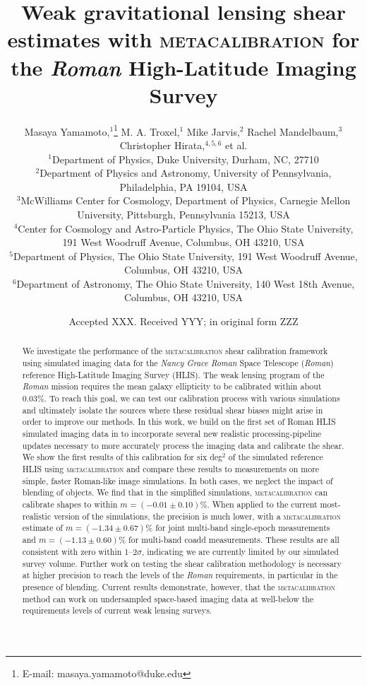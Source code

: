 \documentclass[fleqn,usenatbib]{mnras}
\title[Metacalibration for the Roman High-Latitude Imaging Survey]{Weak gravitational lensing shear estimates with \textsc{metacalibration} for the \emph{Roman} High-Latitude Imaging Survey}
\author[M. Yamamoto et al.]{
Masaya Yamamoto,$^{1}$\thanks{E-mail: masaya.yamamoto@duke.edu}
M. A. Troxel,$^{1}$
Mike Jarvis,$^{2}$
Rachel Mandelbaum,$^{3}$
Christopher Hirata,$^{4,5,6}$
 et al.\\
$^{1}$Department of Physics, Duke University, Durham, NC, 27710\\
$^{2}$Department of Physics and Astronomy, University of Pennsylvania, Philadelphia, PA 19104, USA\\
$^{3}$McWilliams Center for Cosmology, Department of Physics, Carnegie Mellon University, Pittsburgh, Pennsylvania 15213, USA\\
$^{4}$Center for Cosmology and Astro-Particle Physics, The Ohio State University, 191 West Woodruff Avenue, Columbus, OH 43210, USA\\
$^{5}$Department of Physics, The Ohio State University, 191 West Woodruff Avenue, Columbus, OH 43210, USA\\
$^{6}$Department of Astronomy, The Ohio State University, 140 West 18th Avenue, Columbus, OH 43210, USA\\
}
\date{Accepted XXX. Received YYY; in original form ZZZ}
\begin{document}
\label{firstpage}
\pagerange{\pageref{firstpage}--\pageref{lastpage}}
\maketitle

\begin{abstract}
We investigate the performance of the \textsc{metacalibration} shear calibration framework using simulated imaging data for the \emph{Nancy Grace Roman} Space Telescope (\emph{Roman}) reference High-Latitude Imaging Survey (HLIS). 
The weak lensing program of the \emph{Roman} mission requires the mean galaxy ellipticity to be calibrated within about 0.03\%. To reach this goal, we can test our calibration process with various simulations and ultimately isolate the sources where these residual shear biases might arise in order to improve our methods. In this work, we build on the first set of Roman HLIS simulated imaging data in \cite{2021MNRAS.501.2044T} to incorporate several new realistic processing-pipeline updates necessary to more accurately process the imaging data and calibrate the shear. We show the first results of this calibration for six deg$^{2}$ of the simulated reference HLIS using \textsc{metacalibration} and compare these results to measurements on more simple, faster Roman-like image simulations. In both cases, we neglect the impact of blending of objects. We find that in the simplified simulations, \textsc{metacalibration} can calibrate shapes to within $m=(-0.01\pm 0.10)$\%. When applied to the current most-realistic version of the simulations, the precision is much lower, with a \textsc{metacalibration} estimate of $m=(-1.34\pm 0.67)$\% for joint multi-band single-epoch measurements and $m=(-1.13\pm 0.60)$\% for multi-band coadd measurements. These results are all consistent with zero within 1--2$\sigma$, indicating we are currently limited by our simulated survey volume. Further work on testing the shear calibration methodology is necessary at higher precision to reach the levels of the \textit{Roman} requirements, in particular in the presence of blending. 
Current results demonstrate, however, that the \textsc{metacalibration} method can work on undersampled space-based imaging data at well-below the requirements levels of current weak lensing surveys.
\end{abstract}
\end{document}
